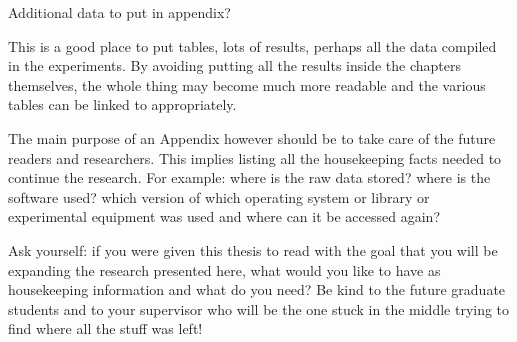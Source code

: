 \label{chapter:appendix}

Additional data to put in appendix?

This is a good place to put tables, lots of results, perhaps all the data compiled in the experiments. By avoiding putting all the results inside the chapters themselves, the whole thing may become much more readable and the various tables can be linked to appropriately.

The main purpose of an Appendix however should be to take care of the future readers and researchers. This implies listing all the housekeeping facts needed to continue the research. For example: where is the raw data stored? where is the software used? which version of which operating system or library or experimental equipment was used and where can it be accessed again?

Ask yourself: if you were given this thesis to read with the goal that you will be expanding the research presented here, what would you like to have as housekeeping information and what do you need? Be kind to the future graduate students and to your supervisor who will be the one stuck in the middle trying to find where all the stuff was left!

